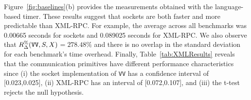 \documentclass{sig-alternate}
\begin{document}

\sloppy Figure~\ref{fig:baselines}(b) provides the measurements
obtained with the language-based timer.  These results suggest that
sockets are both faster and more predictable than XML-RPC.  For
example, the average across all benchmarks was 0.00665 seconds for
sockets and 0.089025 seconds for XML-RPC.  We also observe that
{\small $R_\Delta^\%(\mbox{{\tt VV}},S,X)$}$=278.48\%$ and there is no
overlap in the standard deviation for each benchmark's time overhead.
Finally, Table~\ref{tab:XMLResults} reveals that the communication
primitives have different performance characteristics since (i) the
socket implementation of \texttt{VV} has a confidence interval of
[0.023,0.025], (ii) XML-RPC has an interval of [0.072,0.107], and
(iii) the t-test rejects the null hypothesis.







\end{document}
